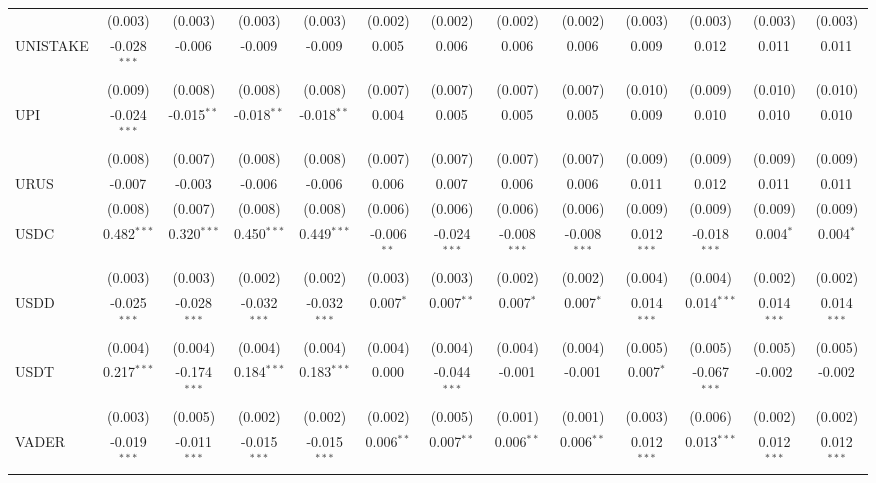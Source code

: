\begin{table}[!htbp]
\begin{tabular}{@{\extracolsep{5pt}}lcccccccccccc}
  & (0.003) & (0.003) & (0.003) & (0.003) & (0.002) & (0.002) & (0.002) & (0.002) & (0.003) & (0.003) & (0.003) & (0.003) \\
 UNISTAKE & -0.028$^{***}$ & -0.006$^{}$ & -0.009$^{}$ & -0.009$^{}$ & 0.005$^{}$ & 0.006$^{}$ & 0.006$^{}$ & 0.006$^{}$ & 0.009$^{}$ & 0.012$^{}$ & 0.011$^{}$ & 0.011$^{}$ \\
  & (0.009) & (0.008) & (0.008) & (0.008) & (0.007) & (0.007) & (0.007) & (0.007) & (0.010) & (0.009) & (0.010) & (0.010) \\
 UPI & -0.024$^{***}$ & -0.015$^{**}$ & -0.018$^{**}$ & -0.018$^{**}$ & 0.004$^{}$ & 0.005$^{}$ & 0.005$^{}$ & 0.005$^{}$ & 0.009$^{}$ & 0.010$^{}$ & 0.010$^{}$ & 0.010$^{}$ \\
  & (0.008) & (0.007) & (0.008) & (0.008) & (0.007) & (0.007) & (0.007) & (0.007) & (0.009) & (0.009) & (0.009) & (0.009) \\
 URUS & -0.007$^{}$ & -0.003$^{}$ & -0.006$^{}$ & -0.006$^{}$ & 0.006$^{}$ & 0.007$^{}$ & 0.006$^{}$ & 0.006$^{}$ & 0.011$^{}$ & 0.012$^{}$ & 0.011$^{}$ & 0.011$^{}$ \\
  & (0.008) & (0.007) & (0.008) & (0.008) & (0.006) & (0.006) & (0.006) & (0.006) & (0.009) & (0.009) & (0.009) & (0.009) \\
 USDC & 0.482$^{***}$ & 0.320$^{***}$ & 0.450$^{***}$ & 0.449$^{***}$ & -0.006$^{**}$ & -0.024$^{***}$ & -0.008$^{***}$ & -0.008$^{***}$ & 0.012$^{***}$ & -0.018$^{***}$ & 0.004$^{*}$ & 0.004$^{*}$ \\
  & (0.003) & (0.003) & (0.002) & (0.002) & (0.003) & (0.003) & (0.002) & (0.002) & (0.004) & (0.004) & (0.002) & (0.002) \\
 USDD & -0.025$^{***}$ & -0.028$^{***}$ & -0.032$^{***}$ & -0.032$^{***}$ & 0.007$^{*}$ & 0.007$^{**}$ & 0.007$^{*}$ & 0.007$^{*}$ & 0.014$^{***}$ & 0.014$^{***}$ & 0.014$^{***}$ & 0.014$^{***}$ \\
  & (0.004) & (0.004) & (0.004) & (0.004) & (0.004) & (0.004) & (0.004) & (0.004) & (0.005) & (0.005) & (0.005) & (0.005) \\
 USDT & 0.217$^{***}$ & -0.174$^{***}$ & 0.184$^{***}$ & 0.183$^{***}$ & 0.000$^{}$ & -0.044$^{***}$ & -0.001$^{}$ & -0.001$^{}$ & 0.007$^{*}$ & -0.067$^{***}$ & -0.002$^{}$ & -0.002$^{}$ \\
  & (0.003) & (0.005) & (0.002) & (0.002) & (0.002) & (0.005) & (0.001) & (0.001) & (0.003) & (0.006) & (0.002) & (0.002) \\
 VADER & -0.019$^{***}$ & -0.011$^{***}$ & -0.015$^{***}$ & -0.015$^{***}$ & 0.006$^{**}$ & 0.007$^{**}$ & 0.006$^{**}$ & 0.006$^{**}$ & 0.012$^{***}$ & 0.013$^{***}$ & 0.012$^{***}$ & 0.012$^{***}$ \\

\end{tabular}
\end{table}
